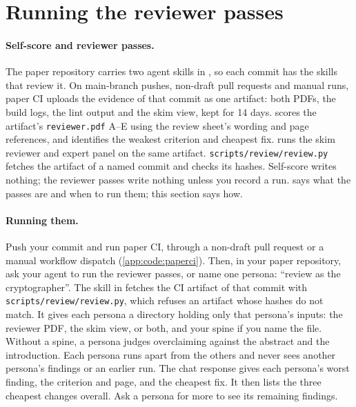 
\section{Running the reviewer passes}\label{app:code:reviewers}
\paragraph{Self-score and reviewer passes.} The paper repository carries two agent skills in , so each commit has the skills that review it. On main-branch pushes, non-draft pull requests and manual runs, paper CI uploads the evidence of that commit as one artifact: both PDFs, the build logs, the lint output and the skim view, kept for 14 days.  scores the artifact's \texttt{reviewer.pdf} A--E using the review sheet's wording and page references, and identifies the weakest criterion and cheapest fix.  runs the skim reviewer and expert panel on the same artifact. \texttt{scripts/review/review.py} fetches the artifact of a named commit and checks its hashes. Self-score writes nothing; the reviewer passes write nothing unless you record a run.  says what the passes are and when to run them; this section says how.

\paragraph{Running them.} Push your commit and run paper CI, through a non-draft pull request or a manual workflow dispatch (\cref{app:code:paperci}). Then, in your paper repository, ask your agent to run the reviewer passes, or name one persona: \enquote{review as the cryptographer}. The skill in  fetches the CI artifact of that commit with \texttt{scripts/review/review.py}, which refuses an artifact whose hashes do not match. It gives each persona a directory holding only that persona's inputs: the reviewer PDF, the skim view, or both, and your spine if you name the file. Without a spine, a persona judges overclaiming against the abstract and the introduction. Each persona runs apart from the others and never sees another persona's findings or an earlier run. The chat response gives each persona's worst finding, the criterion and page, and the cheapest fix. It then lists the three cheapest changes overall. Ask a persona for more to see its remaining findings.

